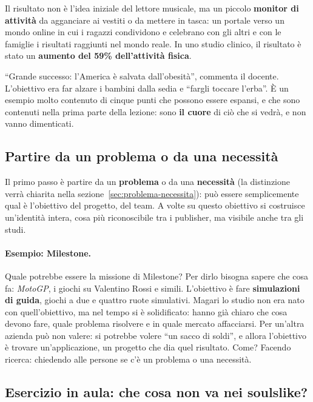 Il risultato non è l'idea iniziale del lettore musicale, ma un piccolo
\textbf{monitor di attività} da agganciare ai vestiti o da mettere in tasca:
un portale verso un mondo online in cui i ragazzi condividono e celebrano con
gli altri e con le famiglie i risultati raggiunti nel mondo reale. In uno
studio clinico, il risultato è stato un \textbf{aumento del 59\%
dell'attività fisica}.

``Grande successo: l'America è salvata dall'obesità'', commenta il docente.
L'obiettivo era far alzare i bambini dalla sedia e ``fargli toccare l'erba''.
È un esempio molto contenuto di cinque punti che possono essere espansi, e
che sono contenuti nella prima parte della lezione: sono \textbf{il cuore} di
ciò che si vedrà, e non vanno dimenticati.

\subsection{Partire da un problema o da una necessità}

Il primo passo è partire da un \textbf{problema} o da una \textbf{necessità}
(la distinzione verrà chiarita nella sezione~\ref{sec:problema-necessita}):
può essere semplicemente qual è l'obiettivo del progetto, del team. A volte su
questo obiettivo si costruisce un'identità intera, cosa più riconoscibile tra
i publisher, ma visibile anche tra gli studi.

\paragraph{Esempio: Milestone.} Quale potrebbe essere la missione di
Milestone? Per dirlo bisogna sapere che cosa fa: \emph{MotoGP}, i giochi su
Valentino Rossi e simili. L'obiettivo è fare \textbf{simulazioni di guida},
giochi a due e quattro ruote simulativi. Magari lo studio non era nato con
quell'obiettivo, ma nel tempo si è solidificato: hanno già chiaro che cosa
devono fare, quale problema risolvere e in quale mercato affacciarsi. Per
un'altra azienda può non valere: si potrebbe volere ``un sacco di soldi'', e
allora l'obiettivo è trovare un'applicazione, un progetto che dia quel
risultato. Come? Facendo ricerca: chiedendo alle persone se c'è un problema o
una necessità.

\subsection{Esercizio in aula: che cosa non va nei soulslike?}

